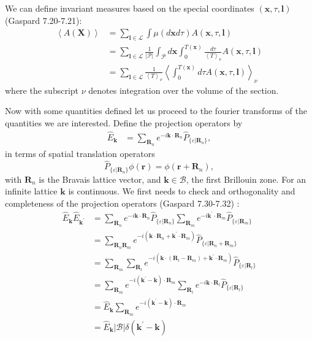 \begin{description}
We can define invariant measures based on the special coordinates
$(\mathbf{x},\tau,\mathbf{l})$ (Gaspard 7.20-7.21):
\begin{align*}
\left\langle A(\mathbf{X})\right\rangle  & =\sum_{\mathbf{l}\in\mathcal{L}}\int\mu(d\mathbf{x}d\tau)A(\mathbf{x},\tau,\mathbf{l})\\
 & =\sum_{\mathbf{l}\in\mathcal{L}}\frac{1}{\vert\mathcal{P}\vert}\int_{\mathcal{P}}d\mathbf{x}\int_{0}^{T(\mathbf{x})}\frac{d\tau}{\left\langle T\right\rangle _{\nu}}A(\mathbf{x},\tau,\mathbf{l})\\
 & =\sum_{\mathbf{l}\in\mathcal{L}}\frac{1}{\left\langle T\right\rangle _{\nu}}\left\langle \int_{0}^{T(\mathbf{x})}d\tau A(\mathbf{x},\tau,\mathbf{l})\right\rangle _{\nu}
\end{align*}
where the subscript $\nu$ denotes integration over the volume of
the {\Poincare} section.

Now with some quantities defined let us proceed to the fourier transforms
of the quantities we are interested. Define the projection operators by
\begin{align*}
\hat{E}_{\mathbf{k}} & =\sum_{\mathbf{R}_{n}}e^{-i\mathbf{k}\cdot\mathbf{R}_{n}}\hat{P}_{\{\varepsilon\vert\mathbf{R}_{n}\}},
\end{align*}
in terms of spatial translation operators
\[
\hat{P}_{\{\varepsilon\vert\mathbf{R}_{n}\}}\phi(\mathbf{r})=\phi(\mathbf{r}+\mathbf{R}_{n}),
\]
with $\mathbf{R}_{n}$ is the Bravais lattice vector, and $\mathbf{k}\in\mathcal{B}$,
the first Brillouin zone. For an infinite lattice $\mathbf{k}$ is
continuous. We first needs to check and orthogonality and completeness
of the projection operators (Gaspard 7.30-7.32) :
\begin{align*}
\hat{E}_{\mathbf{k}}\hat{E}_{\mathbf{k^{\prime}}} & =\sum_{\mathbf{R}_{n}}e^{-i\mathbf{k}\cdot\mathbf{R}_{n}}\hat{P}_{\{\varepsilon\vert\mathbf{R}_{n}\}}\sum_{\mathbf{R}_{m}}e^{-i\mathbf{k^{\prime}}\cdot\mathbf{R}_{m}}\hat{P}_{\{\varepsilon\vert\mathbf{R}_{m}\}}\\
 & =\sum_{\mathbf{R}_{n}\mathbf{R}_{m}}e^{-i(\mathbf{k}\cdot\mathbf{R}_{n}+\mathbf{k}^{\prime}\cdot\mathbf{R}_{m})}\hat{P}_{\{\varepsilon\vert\mathbf{R}_{n}+\mathbf{R}_{m}\}}\\
 & =\sum_{\mathbf{R}_{m}}\sum_{\mathbf{R}_{l}}e^{-i(\mathbf{k}\cdot(\mathbf{R}_{l}-\mathbf{R}_{m})+\mathbf{k}^{\prime}\cdot\mathbf{R}_{m})}\hat{P}_{\{\varepsilon\vert\mathbf{R}_{l}\}}\\
 & =\sum_{\mathbf{R}_{m}}e^{-i(\mathbf{k}^{\prime}-\mathbf{k})\cdot\mathbf{R}_{m}}\sum_{\mathbf{R}_{l}}e^{-i\mathbf{k}\cdot\mathbf{R}_{l}}\hat{P}_{\{\varepsilon\vert\mathbf{R}_{l}\}}\\
 & =\hat{E}_{\mathbf{k}}\sum_{\mathbf{R}_{m}}e^{-i(\mathbf{k}^{\prime}-\mathbf{k})\cdot\mathbf{R}_{m}}\\
 & =\hat{E}_{\mathbf{k}}\vert\mathcal{B}\vert\delta(\mathbf{k}^{\prime}-\mathbf{k})
\end{align*}


\end{description}
